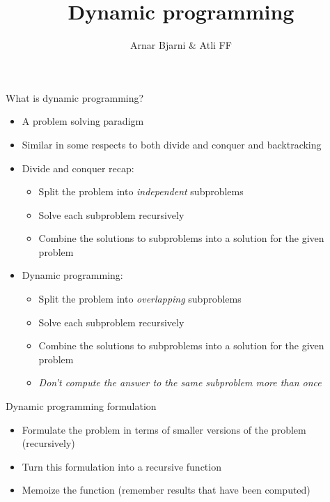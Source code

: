 \documentclass{beamer}
\title{Dynamic programming}
\author{Arnar Bjarni \& Atli FF}
\institute{\href{http://ru.is/td}{School of Computer Science} \\[2pt] \href{http://ru.is}{Reykjavík University}}
\begin{document}
\maketitle

\begin{frame}[plain]{What is dynamic programming?}
    \begin{itemize}
        \item A problem solving paradigm
        \item Similar in some respects to both divide and conquer and backtracking
        \vspace{5pt}
        \item Divide and conquer recap:
        \begin{itemize}
            \item Split the problem into \textit{independent} subproblems
            \item Solve each subproblem recursively
            \item Combine the solutions to subproblems into a solution for the given problem
        \end{itemize}
        \vspace{5pt}
        \item Dynamic programming:
        \begin{itemize}
            \item Split the problem into \textit{overlapping} subproblems
            \item Solve each subproblem recursively
            \item Combine the solutions to subproblems into a solution for the given problem
            \item \textit{Don't compute the answer to the same subproblem more than once}
        \end{itemize}
    \end{itemize}
\end{frame}

\begin{frame}{Dynamic programming formulation}
    \vspace{30pt}
    \begin{itemize}
        \item Formulate the problem in terms of smaller versions of the problem (recursively)
        \item Turn this formulation into a recursive function
        \item Memoize the function (remember results that have been computed)
    \end{itemize}
\end{frame}
\end{document}
